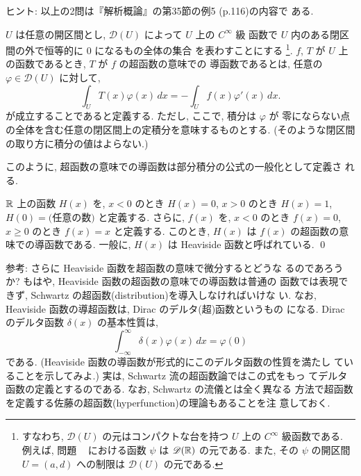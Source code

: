 \documentclass[12pt,twoside]{jarticle}
\newcommand\scr{\mathscr}
\begin{document}
\noindent ヒント: 以上の2問は『解析概論』の第35節の例5 (p.116)の内容で
ある.


\begin{Definition}[超函数の意味での導函数]\label{Def:weak-der}
  $U$ は任意の開区間とし, $\scr{D}(U)$ によって $U$ 上の $C^\infty$ 級
  函数で $U$ 内のある閉区間の外で恒等的に $0$ になるもの全体の集合
  を表わすことにする%
  \footnote{すなわち, $\scr{D}(U)$ の元はコンパクトな台を持つ $U$ 上の 
    $C^\infty$ 級函数である. 例えば, 問題 \ %
    における函数 $\psi$ は $\scr{D}(\R)$ の元である. また, その $\psi$ 
    の開区間 $U=(a,d)$ への制限は $\scr{D}(U)$ の元である. }. %
  $f$, $T$ が $U$ 上の函数であるとき, $T$ が $f$ の超函数の意味での
  導函数であるとは, %
  任意の $\varphi \in \scr{D}(U)$ に対して, 
  \[
    \int_U T(x) \varphi(x) \,dx = - \int_U f(x) \varphi'(x) \,dx.
  \]%
  が成立することであると定義する. ただし, ここで, 積分は $\varphi$ が
  零にならない点の全体を含む任意の閉区間上の定積分を意味するものとする.
  (そのような閉区間の取り方に積分の値はよらない.)
\end{Definition}
%
このように, 超函数の意味での導函数は部分積分の公式の一般化として定義さ
れる.

\begin{question}
  ${\mathbb R}$ 上の函数 $H(x)$ を, $x < 0$ のとき $H(x) = 0$, $x > 0$ のとき %
  $H(x) = 1$, $H(0) = \text{(任意の数)}$ と定義する. さらに, $f(x)$ を, %
  $x < 0$ のとき $f(x) = 0$, $x \ge 0$ のとき $f(x) = x$ と定義する. 
  このとき, $H(x)$ は $f(x)$ の超函数の意味での導函数である.  
  一般に, $H(x)$ は Heaviside 函数と呼ばれている.
  \qed
\end{question}

\noindent 参考: さらに Heaviside 函数を超函数の意味で微分するとどうな
るのであろうか? もはや, Heaviside 函数の超函数の意味での導函数は普通の
函数では表現できず, Schwartz の超函数(distribution)を導入しなければいけな
い. なお, Heaviside 函数の導超函数は, Dirac のデルタ(超)函数というもの
になる.  Dirac のデルタ函数 $\delta(x)$ の基本性質は,
\[
  \int_{-\infty}^\infty \delta(x)\varphi(x) \,dx = \varphi(0)
\]%
である. (Heaviside 函数の導函数が形式的にこのデルタ函数の性質を満たし
ていることを示してみよ.)  実は, Schwartz 流の超函数論ではこの式をもっ
てデルタ函数の定義とするのである. なお, Schwartz の流儀とは全く異なる
方法で超函数を定義する佐藤の超函数(hyperfunction)の理論もあることを注
意しておく.
\end{document}
